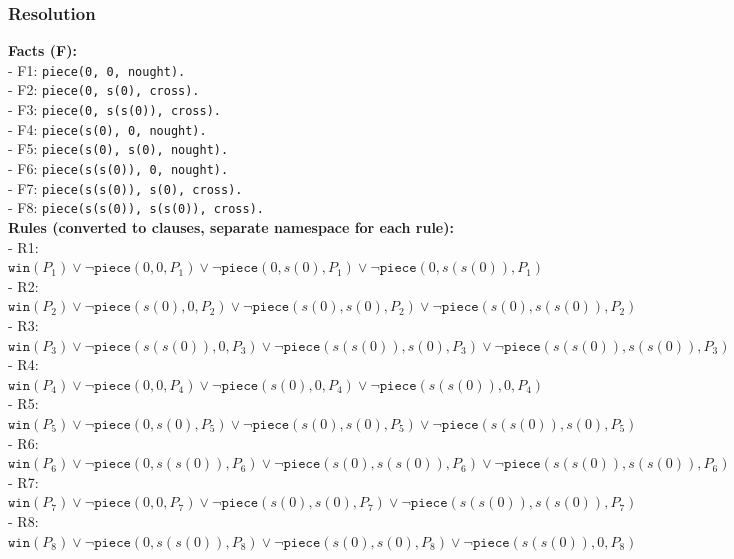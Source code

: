 \documentclass[10pt, a4paper]{article}
\begin{document}
\subsubsection{Resolution}

\textbf{Facts (F):}\\


- F1:  \texttt{piece(0, 0, nought).}\\
- F2:  \texttt{piece(0, s(0), cross).}\\
- F3:  \texttt{piece(0, s(s(0)), cross).}\\
- F4:  \texttt{piece(s(0), 0, nought).}\\
- F5:  \texttt{piece(s(0), s(0), nought).}\\
- F6:  \texttt{piece(s(s(0)), 0, nought).}\\
- F7:  \texttt{piece(s(s(0)), s(0), cross).}\\
- F8:  \texttt{piece(s(s(0)), s(s(0)), cross).}\\

\textbf{Rules (converted to clauses, separate namespace for each rule):}\\


- R1: \(\texttt{win}(P_1) \lor \lnot\texttt{piece}(0, 0, P_1) \lor \lnot\texttt{piece}(0, s(0), P_1) \lor \lnot\texttt{piece}(0, s(s(0)), P_1)\)\\
- R2: \(\texttt{win}(P_2) \lor \lnot\texttt{piece}(s(0), 0, P_2) \lor \lnot\texttt{piece}(s(0), s(0), P_2) \lor \lnot\texttt{piece}(s(0), s(s(0)), P_2)\)\\
- R3: \(\texttt{win}(P_3) \lor \lnot\texttt{piece}(s(s(0)), 0, P_3) \lor \lnot\texttt{piece}(s(s(0)), s(0), P_3) \lor \lnot\texttt{piece}(s(s(0)), s(s(0)), P_3)\)\\
- R4: \(\texttt{win}(P_4) \lor \lnot\texttt{piece}(0, 0, P_4) \lor \lnot\texttt{piece}(s(0), 0, P_4) \lor \lnot\texttt{piece}(s(s(0)), 0, P_4)\)\\
- R5: \(\texttt{win}(P_5) \lor \lnot\texttt{piece}(0, s(0), P_5) \lor \lnot\texttt{piece}(s(0), s(0), P_5) \lor \lnot\texttt{piece}(s(s(0)), s(0), P_5)\)\\
- R6: \(\texttt{win}(P_6) \lor \lnot\texttt{piece}(0, s(s(0)), P_6) \lor \lnot\texttt{piece}(s(0), s(s(0)), P_6) \lor \lnot\texttt{piece}(s(s(0)), s(s(0)), P_6)\)\\
- R7: \(\texttt{win}(P_7) \lor \lnot\texttt{piece}(0, 0, P_7) \lor \lnot\texttt{piece}(s(0), s(0), P_7) \lor \lnot\texttt{piece}(s(s(0)), s(s(0)), P_7)\)\\
- R8: \(\texttt{win}(P_8) \lor \lnot\texttt{piece}(0, s(s(0)), P_8) \lor \lnot\texttt{piece}(s(0), s(0), P_8) \lor \lnot\texttt{piece}(s(s(0)), 0, P_8)\)\\
\end{document}
